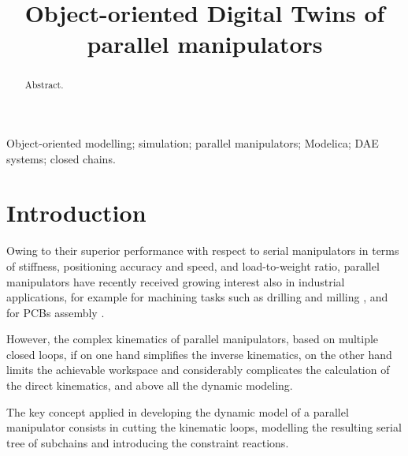 \documentclass[]{interact}
\theoremstyle{plain}%
\theoremstyle{definition}
\theoremstyle{remark}
\begin{document}

\title{Object-oriented Digital Twins of parallel manipulators}

\author{
}

\maketitle

\begin{abstract}

Abstract.

\end{abstract}

\begin{keywords}
Object-oriented modelling; simulation; parallel manipulators; Modelica; DAE systems; closed chains.
\end{keywords}


\section{Introduction}

Owing to their superior performance with respect to serial manipulators in terms of stiffness, positioning accuracy and speed, and load-to-weight ratio, parallel manipulators have recently received growing interest also in industrial applications, for example for machining tasks such as drilling and milling \cite{ESCORCIAHERNANDEZ2020103864}, and for PCBs assembly \cite{HESSELBACH1997223}.

However, the complex kinematics of parallel manipulators, based on multiple closed loops, if on one hand simplifies the inverse kinematics, on the other hand limits the achievable workspace and considerably complicates the calculation of the direct kinematics, and above all the dynamic modeling.

The key concept applied in developing the dynamic model of a parallel manipulator consists in cutting the kinematic loops, modelling the resulting serial tree of subchains and introducing the constraint reactions.
\end{document}

